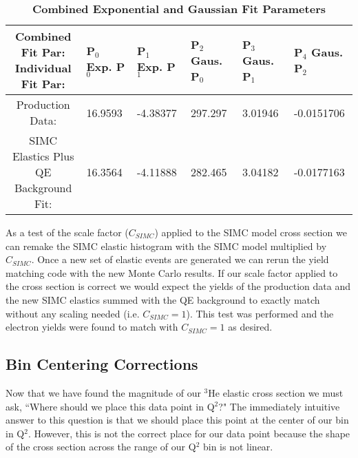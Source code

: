 \begin{table}[!h]
\centering
\begin{tabular}{|c | l l l l l|}
\hline
\makecell{\textbf{Combined Fit Par:}\\ \textbf{Individual Fit Par:}} & \makecell{\textbf{P$_0$}\\ \textbf{Exp. P$_0$}} & \makecell{\textbf{P$_1$}\\ \textbf{Exp. P$_1$}} & \makecell{\textbf{P$_2$}\\ \textbf{Gaus. P$_0$}} & \makecell{\textbf{P$_3$}\\ \textbf{Gaus. P$_1$}} & \makecell{\textbf{P$_4$}\\ \textbf{Gaus. P$_2$}}\\
\hline
Production Data: & 16.9593 & -4.38377 & 297.297 & 3.01946 & -0.0151706 \\ 
\makecell{SIMC Elastics Plus\\ QE Background Fit}: & 16.3564 & -4.11888 & 282.465 & 3.04182 & -0.0177163 \\ 
\hline
\end{tabular}
\caption{{\bf{Combined Exponential and Gaussian Fit Parameters}} }
\label{tab:peak_pars}
\end{table}

As a test of the scale factor ($C_{SIMC}$) applied to the SIMC model cross section we can remake the SIMC elastic histogram with the SIMC model multiplied by $C_{SIMC}$. Once a new set of elastic events are generated we can rerun the yield matching code with the new Monte Carlo results. If our scale factor applied to the cross section is correct we would expect the yields of the production data and the new SIMC elastics summed with the QE background to exactly match without any scaling needed (i.e. $C_{SIMC}=1$). This test was performed and the electron yields were found to match with $C_{SIMC}=1$ as desired.

\subsection{Bin Centering Corrections}
\label{ssec:bin_cor}

Now that we have found the magnitude of our $^3$He elastic cross section we must ask, ``Where should we place this data point in Q$^2$?" The immediately intuitive answer to this question is that we should place this point at the center of our bin in Q$^2$. However, this is not the correct place for our data point because the shape of the cross section across the range of our Q$^2$ bin is not linear.
 
